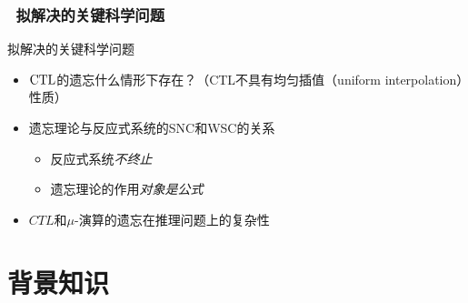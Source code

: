 \documentclass[9pt, CJK]{beamer}
\begin{document}
\begin{frame}
	\frametitle{~拟解决的关键科学问题}
{\footnotesize
	\begin{block}{拟解决的关键科学问题}
		\begin{itemize}
			\item  $\textrm{CTL}$的遗忘什么情形下存在？（CTL不具有均匀插值（uniform interpolation）性质）
			\item 遗忘理论与反应式系统的SNC和WSC的关系
			\begin{itemize}
				\item 反应式系统{\em 不终止}
				\item 遗忘理论的作用{\em 对象是公式}
			\end{itemize}
			\item $CTL$和$\mu$-演算的遗忘在推理问题上的复杂性
		\end{itemize}
	\end{block}
}
\end{frame}


\section{背景知识}
\end{document}
